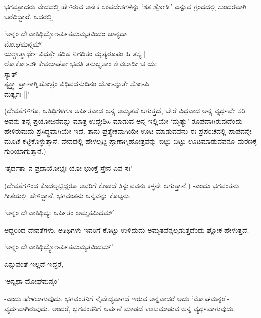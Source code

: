 ಭಗವತ್ಪಾದರು ವೇದದಲ್ಲಿ ಹೇಳಿರುವ ಅನೇಕ ಉಪದೇಶಗಳನ್ನು `ಶತ ಶ್ಲೋಕೀ' ಎನ್ನುವ ಗ್ರಂಥದಲ್ಲಿ ಸುಂದರವಾಗಿ ಬರೆದಿದ್ದಾರೆ. ಅದರಲ್ಲಿ

\begin{shloka}
`ಅನ್ನಂ ದೇವಾತಿಥಿಭ್ಯೋಽರ್ಪಿತಮಮೃತಮಿದಂ ಚಾನ್ಯಥಾ\\
\hspace{5.3cm} ಮೋಘಮನ್ನಮ್\\
ಯಶ್ಚಾತ್ಮಾರ್ಥೇ ವಿಧತ್ತೇ ತದಿಹ ನಿಗದಿತಂ ಮೃತ್ಯರೂಪಂ ಹಿ ತಸ್ಯ |\\
ಲೋಕೋಽಸೌ ಕೇವಲಾಘೋ ಭವತಿ ತನುಭೃತಾಂ ಕೇವಲಾದೀ ಚ ಯಃ\\
\hspace{5.3cm} ಸ್ಯಾತ್\\
ತ್ಯಕ್ತ್ವಾ ಪ್ರಾಣಾಗ್ನಿಹೋತ್ರಂ ವಿಧಿವದನುದಿನಂ ಯೋಽಶ್ನುತೇ ಸೋಽಪಿ\\
\hspace{5.3cm} ಮರ್ತ್ಯಃ ||'
\end{shloka}

(ದೇವತೆಗಳಿಗೂ, ಅತಿಥಿಗಳಿಗೂ ಅರ್ಪಿತವಾದ ಅನ್ನ ಅಮೃತವೆ ಆಗುತ್ತದೆ, ಬೇರೆ ವಿಧವಾದ ಅನ್ನ ವ್ಯರ್ಥವೇ ಸರಿ. ಅವನು ತನ್ನ ಪ್ರಯೋಜನವನ್ನು ಮಾತ್ರ ಉದ್ದೇಶಿಸಿ ಮಾಡುವ ಅನ್ನ ಇಲ್ಲಿಯೇ `ಮೃತ್ಯು' ರೂಪವಾಗಿರುವುದೆಂದು ಹೇಳಿರುವುದು ಪ್ರಸಿದ್ಧವಾಗಿಯೇ ಇದೆ. ತಾನು ಪ್ರತ್ಯೇಕವಾಗಿಯೇ ಊಟ ಮಾಡುವವನು ಈ ಪ್ರಪಂಚದಲ್ಲಿ ಪಾಪವನ್ನೇ ಮೂಟೆ ಕಟ್ಟಿಕೊಳ್ಳುತ್ತಾನೆ. ವೇದದಲ್ಲಿ ಹೇಳಲ್ಪಟ್ಟ ಪ್ರಾಣಾಗ್ನಿಹೋತ್ರವನ್ನು ಬಿಟ್ಟು ಬಿಟ್ಟು ಊಟಮಾಡುವವನೂ ಮರಣಕ್ಕೆ ಗುರಿಯಾಗುತ್ತಾನೆ.)

\begin{shloka}
`ತೈರ್ದತ್ತಾ ನ ಪ್ರದಾಯೋಭ್ಯಃ ಯೋ ಭುಂಕ್ತೆ ಸ್ತೇನ ಏವ ಸಃ'
\end{shloka}

(ದೇವತೆಗಳಿಂದ ಕೊಡಲ್ಪಟ್ಟಿದ್ದರೂ ಅವರಿಗೆ ಕೊಡದೆ ತಿನ್ನುವವನು ಕಳ್ಳನೇ ಆಗುತ್ತಾನೆ.) -ಎಂದು ಭಗವಂತನು ಗೀತೆಯಲ್ಲಿ ಹೇಳಿದ್ದಾನೆ. ಭಗವಂತನು ಅನ್ನವನ್ನು ಕೊಟ್ಟನು.

\begin{shloka}
`ಅನ್ನಂ ದೇವಾತಿಥಿಭ್ಯಃ ಅರ್ಪಿತಂ ಅಮೃತಮಿದಮ್'
\end{shloka}

ಆದ್ದರಿಂದ ದೇವತೆಗಳು, ಅತಿಥಿಗಳು ಇವರಿಗೆ ಕೊಟ್ಟು ಉಳಿದುದು ಅಮೃತವೆನ್ನಲ್ಪಡುತ್ತದೆಂದು ಶ್ಲೋಕ ಹೇಳುತ್ತದೆ.

\begin{shloka}
`ಅನ್ನಂ ದೇವಾತಿಥಿಭ್ಯೋಽರ್ಪಿತಮಮೃತಮಿದಮ್'
\end{shloka}

ಎನ್ನುವಂತೆ ಇಲ್ಲದೆ ಇದ್ದರೆ,

\begin{shloka}
`ಅನ್ಯಥಾ ಮೋಘಮನ್ನಂ'
\end{shloka}

-ಎಂದು ಹೇಳಲಾಗುವುದು. ಭಗವಂತನಿಗೆ ನೈವೇದ್ಯವಾಗದೆ ಇರುವ ಅನ್ನವಾದರೆ ಅದು `ಮೋಘಮನ್ನಂ'-ವ್ಯರ್ಥವಾಗಿರುವುದು. ಅಂದರೆ, ಭಗವಂತನಿಗೆ ಅರ್ಪಣೆ ಮಾಡದೆ ಊಟಮಾಡುವ ಅನ್ನ ವ್ಯರ್ಥವಾಗುವುದು.

